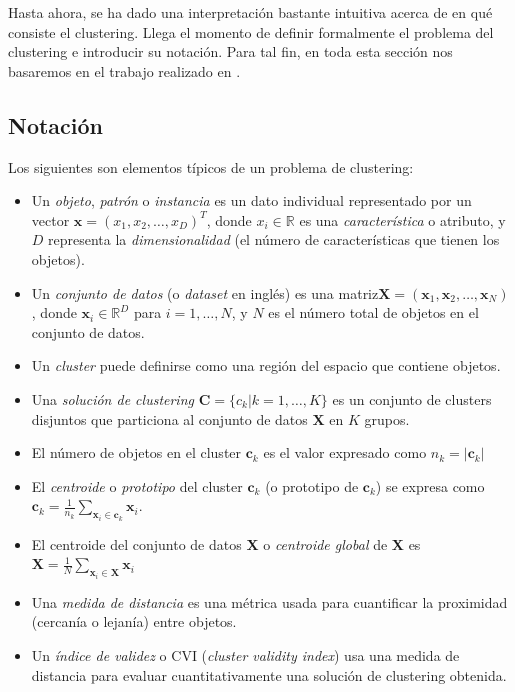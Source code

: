 Hasta ahora, se ha dado una interpretación bastante intuitiva acerca de en qué consiste el clustering. Llega el momento de definir formalmente el problema del clustering e introducir su notación. Para tal fin, en toda esta sección nos basaremos en el trabajo realizado en \cite{jose2016automatic}.

\subsection{Notación}

Los siguientes son elementos típicos de un problema de clustering:

\begin{itemize}
	\item Un \emph{objeto}, \emph{patrón} o \emph{instancia} es un dato individual representado por un vector $\textbf{x} = (x_1, x_2,\dots, x_D )^T$, donde $x_i \in \mathbb{R}$ es una \emph{característica} o atributo, y $D$ representa la \emph{dimensionalidad} (el número de características que tienen los objetos). 
	\item Un \emph{conjunto de datos} (o \emph{dataset} en inglés) es una matriz\newline$\textbf{X} = ( \textbf{x}_1, \textbf{x}_2, \dots, \textbf{x}_N )$, donde $\textbf{x}_i \in \mathbb{R}^{D}$ para $i=1,\dots,N$, y $N$ es el número total de objetos en el conjunto de datos.
	\item Un \emph{cluster} puede definirse como una región del espacio que contiene objetos.
	\item Una \emph{solución de clustering} $\textbf{C} = \{c_k | k=1,\dots,K \}$ es un conjunto de clusters disjuntos que particiona al conjunto de datos $\textbf{X}$ en $K$ grupos.
	\item El número de objetos en el cluster $\textbf{c}_k$ es el valor expresado como $n_k = |\textbf{c}_k|$
	\item El \emph{centroide} o \emph{prototipo} del cluster $\textbf{c}_k$ (o prototipo de $\textbf{c}_k$) se expresa como $\textbf{\=c}_k = \frac{1}{n_k}\sum_{\textbf{x}_i \in \textbf{c}_k} \textbf{x}_i$.
	\item El centroide del conjunto de datos \textbf{X} o \emph{centroide global} de \textbf{X} es\newline$\textbf{\=X} = \frac{1}{N} \sum_{\textbf{x}_i \in \textbf{X}} \textbf{x}_i$
	\item Una \emph{medida de distancia} es una métrica usada para cuantificar la proximidad (cercanía o lejanía) entre objetos.
	\item Un \emph{índice de validez} o CVI (\emph{cluster validity index}) usa una medida de distancia para evaluar cuantitativamente una solución de clustering obtenida.
\end{itemize}
